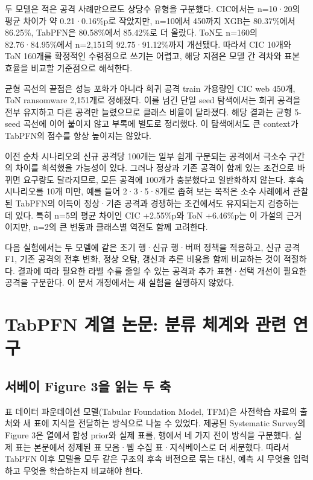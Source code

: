 두 모델은 적은 공격 사례만으로도 상당수 유형을 구분했다. CIC에서는 n=\allowbreak{}10·20의 평균 차이가 약 0.21·0.16\%p로 작았지만, n=\allowbreak{}10에서 450까지 XGB는 80.37\%에서 86.25\%, TabPFN은 80.58\%에서 85.42\%로 더 올랐다. ToN도 n=\allowbreak{}160의 82.76·84.95\%에서 n=\allowbreak{}2,151의 92.75·91.12\%까지 개선됐다. 따라서 CIC 10개와 ToN 160개를 확정적인 수렴점으로 쓰기는 어렵고, 해당 지점은 모델 간 격차와 표본 효율을 비교할 기준점으로 해석한다.


균형 곡선의 끝점은 성능 포화가 아니라 희귀 공격 train 가용량인 CIC web 450개, ToN ransomware 2,151개로 정해졌다. 이를 넘긴 단일 seed 탐색에서는 희귀 공격을 전부 유지하고 다른 공격만 늘렸으므로 클래스 비율이 달라졌다. 해당 결과는 균형 5-seed 곡선에 이어 붙이지 않고 부록에 별도로 정리했다. 이 탐색에서도 큰 context가 TabPFN의 점수를 항상 높이지는 않았다.


이전 순차 시나리오의 신규 공격당 100개는 일부 쉽게 구분되는 공격에서 극소수 구간의 차이를 희석했을 가능성이 있다. 그러나 정상과 기존 공격이 함께 있는 조건으로 바뀌면 요구량도 달라지므로, 모든 공격에 100개가 충분했다고 일반화하지 않는다. 후속 시나리오를 10개 미만, 예를 들어 2·3·5·8개로 좁혀 보는 목적은 소수 사례에서 관찰된 TabPFN의 이득이 정상·기존 공격과 경쟁하는 조건에서도 유지되는지 검증하는 데 있다. 특히 n=\allowbreak{}5의 평균 차이인 CIC +\allowbreak{}2.55\%p와 ToN +\allowbreak{}6.46\%p는 이 가설의 근거이지만, n=\allowbreak{}2의 큰 변동과 클래스별 역전도 함께 고려한다.


다음 실험에서는 두 모델에 같은 초기 행·신규 행·버퍼 정책을 적용하고, 신규 공격 F1, 기존 공격의 전후 변화, 정상 오탐, 갱신과 추론 비용을 함께 비교하는 것이 적절하다. 결과에 따라 필요한 라벨 수를 줄일 수 있는 공격과 추가 표현·선택 개선이 필요한 공격을 구분한다. 이 문서 개정에서는 새 실험을 실행하지 않았다.


\clearpage

\section{TabPFN 계열 논문: 분류 체계와 관련 연구}

\subsection{서베이 Figure 3을 읽는 두 축}

표 데이터 파운데이션 모델(Tabular Foundation Model, TFM)은 사전학습 자료의 출처와 새 표에 지식을 전달하는 방식으로 나눌 수 있었다. 제공된 Systematic Survey의 Figure 3은 열에서 합성 prior와 실제 표를, 행에서 네 가지 전이 방식을 구분했다. 실제 표는 본문에서 정제된 표 모음·웹 수집 표·지식베이스로 더 세분했다. 따라서 TabPFN 이후 모델을 모두 같은 구조의 후속 버전으로 묶는 대신, 예측 시 무엇을 입력하고 무엇을 학습하는지 비교해야 한다.


